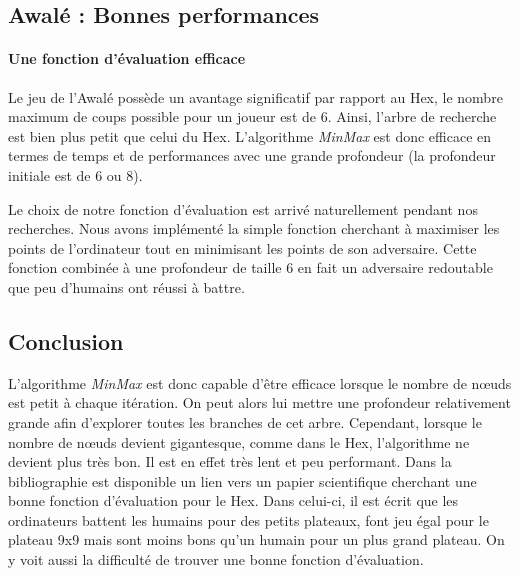 


\subsection{Awalé : Bonnes performances}
\paragraph{Une fonction d'évaluation efficace} 
Le jeu de l'Awalé possède un avantage significatif par rapport au Hex, le nombre maximum de coups
possible pour un joueur est de 6. Ainsi, l'arbre de recherche est bien plus petit que celui du Hex. L'algorithme \emph{MinMax} est donc efficace en termes de
temps et de performances avec une grande profondeur (la profondeur initiale est de 6 ou 8).

Le choix de notre fonction d'évaluation est arrivé naturellement pendant nos recherches. Nous avons implémenté la simple fonction cherchant à
maximiser les points de l'ordinateur tout en minimisant les points de son adversaire. Cette fonction combinée à une profondeur de taille 6 en fait un
adversaire redoutable que peu d'humains ont réussi à battre.

\subsection{Conclusion}
L'algorithme \emph{MinMax} est donc capable d'être efficace lorsque le nombre de nœuds est petit à chaque itération. On peut alors
lui mettre une profondeur relativement grande afin d'explorer toutes les branches de cet arbre.
Cependant, lorsque le nombre de nœuds devient gigantesque, comme dans le Hex, l'algorithme ne devient plus très bon. Il est en effet très lent et peu performant.
Dans la bibliographie est disponible un lien vers un papier scientifique cherchant une bonne fonction d'évaluation pour le Hex.
Dans celui-ci, il est écrit que les ordinateurs battent les humains pour des petits plateaux, font jeu égal pour le plateau 9x9 mais
sont moins bons qu'un humain pour un plus grand plateau. On y voit aussi la difficulté de trouver une bonne fonction d'évaluation.
